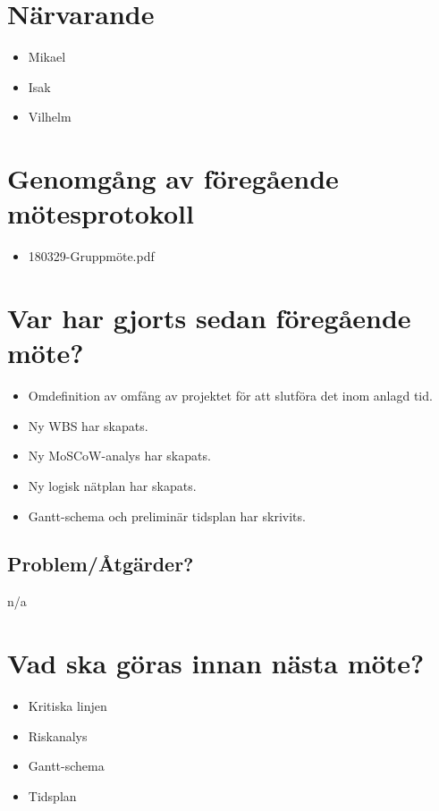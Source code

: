 
\section*{Närvarande}
\begin{itemize}[noitemsep]
    \item Mikael
    \item Isak
    \item Vilhelm
\end{itemize}

\section*{Genomgång av föregående mötesprotokoll}
\begin{itemize}[noitemsep]
    \item 180329-Gruppmöte.pdf
\end{itemize}

\section*{Var har gjorts sedan föregående möte?}
\begin{itemize}[noitemsep]
    \item Omdefinition av omfång av projektet för att slutföra det inom anlagd tid.
    \item Ny WBS har skapats.
    \item Ny MoSCoW-analys har skapats.
    \item Ny logisk nätplan har skapats.
    \item Gantt-schema och preliminär tidsplan har skrivits.
\end{itemize}

\subsection*{Problem/Åtgärder?}
n/a

\section*{Vad ska göras innan nästa möte?}
\begin{itemize}[noitemsep]
    \item Kritiska linjen
    \item Riskanalys
    \item Gantt-schema
    \item Tidsplan
\end{itemize}

